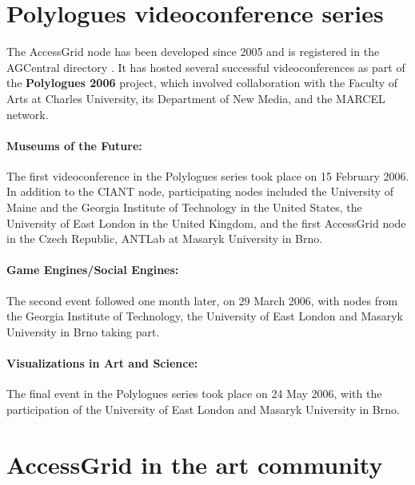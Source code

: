 \section{Polylogues videoconference series}\label{kap:Polylogues}

The AccessGrid node has been developed since 2005 and is registered in the AGCentral directory \cite{CIANT-AGCentral}. It has hosted several successful videoconferences as part of the \textbf{Polylogues 2006} project, which involved collaboration with the Faculty of Arts at Charles University, its Department of New Media, and the MARCEL network.

\paragraph*{Museums of the Future\cite{CIANT-Polylogues-1}:}
The first videoconference in the Polylogues series took place on 15 February 2006. In addition to the CIANT node, participating nodes included the University of Maine and the Georgia Institute of Technology in the United States, the University of East London in the United Kingdom, and the first AccessGrid node in the Czech Republic, ANTLab at Masaryk University in Brno.

\paragraph*{Game Engines/Social Engines\cite{CIANT-Polylogues-2}:}
The second event followed one month later, on 29 March 2006, with nodes from the Georgia Institute of Technology, the University of East London and Masaryk University in Brno taking part.

\paragraph*{Visualizations in Art and Science\cite{CIANT-Polylogues-3}:}
The final event in the Polylogues series took place on 24 May 2006, with the participation of the University of East London and Masaryk University in Brno.

\section{AccessGrid in the art community}\label{kap:AGvUmeleckejKomunite}


